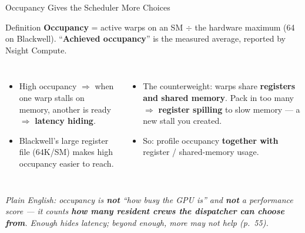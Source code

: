 \documentclass[aspectratio=169]{beamer}
\newcommand{\kw}[1]{\textbf{\textcolor{kwblue}{#1}}}
\newcommand{\pe}[1]{\par{\setlength{\fboxsep}{2.5pt}\noindent\colorbox{navy!9}{\parbox{\dimexpr\textwidth-5pt\relax}{\footnotesize\itshape Plain English: #1}}}}
\begin{document}
\begin{frame}{Occupancy Gives the Scheduler More Choices}
  \begin{block}{Definition}
    \kw{Occupancy} = active warps on an SM $\div$ the hardware maximum (64 on Blackwell).
    ``\kw{Achieved occupancy}'' is the measured average, reported by Nsight Compute.
  \end{block}
  \begin{columns}[t]
    \begin{itemize}
      \item High occupancy $\Rightarrow$ when one warp stalls on memory, another is ready
            $\Rightarrow$ \kw{latency hiding}.
      \item Blackwell's large register file (64K/SM) makes high occupancy easier to reach.
    \end{itemize}
    \begin{itemize}
      \item The counterweight: warps share \kw{registers and shared memory}. Pack in too many
            $\Rightarrow$ \kw{register spilling} to slow memory --- a new stall you created.
      \item So: profile occupancy \kw{together with} register / shared-memory usage.
    \end{itemize}
  \end{columns}
  \pe{occupancy is \kw{not} ``how busy the GPU is'' and \kw{not} a performance score --- it counts \kw{how many resident crews the dispatcher can choose from}. Enough hides latency; beyond enough, more may not help (p.~55).}
\end{frame}
\end{document}
